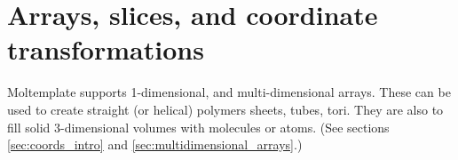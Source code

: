 \documentclass[11pt]{article}
\begin{document}









\section{Arrays, slices, and coordinate transformations}
\label{sec:arrays}
Moltemplate supports 1-dimensional, and multi-dimensional arrays.
These can be used to create straight (or helical) polymers
sheets, tubes, tori.
They are also to fill solid 3-dimensional volumes
with molecules or atoms.
(See sections \ref{sec:coords_intro} and \ref{sec:multidimensional_arrays}.)
\end{document}
